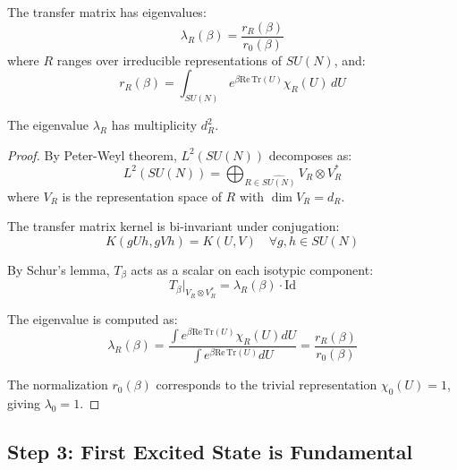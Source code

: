 \begin{theorem}
\label{thm:spectral-decomp-detailed}
The transfer matrix has eigenvalues:
\begin{equation}
\lambda_R(\beta) = \frac{r_R(\beta)}{r_0(\beta)}
\end{equation}
where $R$ ranges over irreducible representations of $SU(N)$, and:
\begin{equation}
r_R(\beta) = \int_{SU(N)} e^{\beta \mathrm{Re}\,\mathrm{Tr}(U)} \chi_R(U) \, dU
\end{equation}

The eigenvalue $\lambda_R$ has multiplicity $d_R^2$.
\end{theorem}

\begin{proof}
By Peter-Weyl theorem, $L^2(SU(N))$ decomposes as:
\begin{equation}
L^2(SU(N)) = \bigoplus_{R \in \widehat{SU(N)}} V_R \otimes V_R^*
\end{equation}
where $V_R$ is the representation space of $R$ with $\dim V_R = d_R$.

The transfer matrix kernel is bi-invariant under conjugation:
\begin{equation}
K(gUh, gVh) = K(U, V) \quad \forall g, h \in SU(N)
\end{equation}

By Schur's lemma, $T_\beta$ acts as a scalar on each isotypic component:
\begin{equation}
T_\beta|_{V_R \otimes V_R^*} = \lambda_R(\beta) \cdot \mathrm{Id}
\end{equation}

The eigenvalue is computed as:
\begin{equation}
\lambda_R(\beta) = \frac{\int e^{\beta \mathrm{Re}\,\mathrm{Tr}(U)} \chi_R(U) dU}{\int e^{\beta \mathrm{Re}\,\mathrm{Tr}(U)} dU} = \frac{r_R(\beta)}{r_0(\beta)}
\end{equation}

The normalization $r_0(\beta)$ corresponds to the trivial representation 
$\chi_0(U) = 1$, giving $\lambda_0 = 1$.
\end{proof}

\subsection{Step 3: First Excited State is Fundamental}

